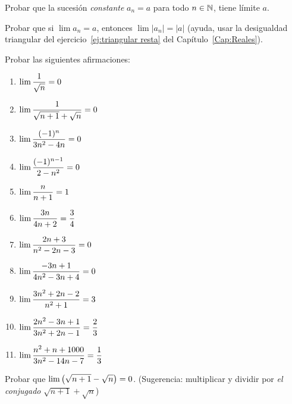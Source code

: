 \item Probar que la sucesión \emph{constante} $a_n=a$ para todo $n\in\mathbb{N}$, tiene límite $a$.

\item Probar que si $\lim a_n = a$, entonces $\lim |a_n| = |a|$ (ayuda, usar la desigualdad triangular del ejercicio~\ref{ej:triangular resta} del Capítulo~\ref{Cap:Reales}).

\item Probar las siguientes afirmaciones:

\begin{multicols}{2}
    \begin{enumerate}
        \item $\displaystyle \lim \frac1{\sqrt{n}} = 0 $
        \item $\displaystyle \lim \frac{1}{\sqrt{n+1}+\sqrt{n}} = 0 $
        \item $\displaystyle \lim \frac{(-1)^n}{3n^2-4n} = 0 $
        \item $\displaystyle \lim \frac{(-1)^{n-1}}{2-n^2} = 0 $
        \item $\displaystyle \lim \frac{n}{n+1} = 1 $
        \item $\displaystyle \lim \frac{3n}{4n+2} = \frac34 $
        \item $\displaystyle \lim \frac{2n+3}{n^2-2n-3} = 0 $
        \item $\displaystyle \lim \frac{-3n+1}{4n^2-3n+4} = 0 $
        \item $\displaystyle \lim \frac{3n^2+2n-2}{n^2+1} = 3 $
        \item $\displaystyle \lim \frac{2n^2-3n+1}{3n^2+2n-1} = \frac23 $
        \item $\displaystyle \lim \frac{n^2+n+1000}{3n^2-14n-7} = \frac13 $
    \end{enumerate}
\end{multicols}

\item Probar que $\displaystyle \lim \big( \sqrt{n+1} - \sqrt{n}\big) = 0$.
(Sugerencia: multiplicar y dividir por \emph{el conjugado} $\sqrt{n+1} + \sqrt{n}$)

